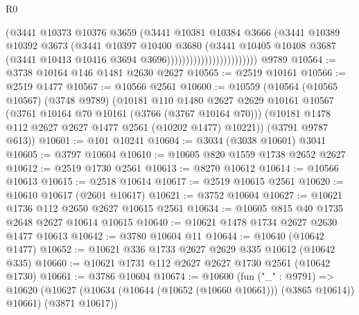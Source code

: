 \begin{lexlean}{R0}
\begin{coremodule}
                                        (@3441
                                          @10373
                                          @10376
                                          @3659
                                          (@3441
                                            @10381
                                            @10384
                                            @3666
                                            (@3441
                                              @10389
                                              @10392
                                              @3673
                                              (@3441
                                                @10397
                                                @10400
                                                @3680
                                                (@3441
                                                  @10405
                                                  @10408
                                                  @3687
                                                  (@3441
                                                    @10413
                                                    @10416
                                                    @3694
                                                    @3696))))))))))))))))))))))))
    @9789
@10564 := @3738 @10164 @146 @1481 @2630 @2627
@10565 := @2519 @10161
@10566 := @2519 @1477
@10567 := @10566 @2561
@10600 := @10559
    (@10564
      (@10565 @10567)
      (@3748 @9789)
      (@10181
        @110
        @1480
        @2627
        @2629
        @10161
        @10567
        (@3761 @10164 @70 @10161 (@3766 (@3767 @10164 @70)))
        (@10181 @1478 @112 @2627 @2627 @1477 @2561 (@10202 @1477) @10221))
      (@3791 @9787 @613))
@10601 := @101 @10241
@10604 := @3034 (@3038 @10601) @3041
@10605 := @3797 @10604
@10610 := @10605 @820 @1559 @1738 @2652 @2627
@10612 := @2519 @1730 @2561
@10613 := @8270 @10612
@10614 := @10566 @10613
@10615 := @2518 @10614
@10617 := @2519 @10615 @2561
@10620 := @10610 @10617 (@2601 @10617)
@10621 := @3752 @10604
@10627 := @10621 @1736 @112 @2650 @2627 @10615 @2561
@10634 := @10605 @815 @40 @1735 @2648 @2627 @10614 @10615
@10640 := @10621 @1478 @1734 @2627 @2630 @1477 @10613
@10642 := @3780 @10604 @11
@10644 := @10640 (@10642 @1477)
@10652 := @10621 @336 @1733 @2627 @2629 @335 @10612 (@10642 @335)
@10660 := @10621 @1731 @112 @2627 @2627 @1730 @2561 (@10642 @1730)
@10661 := @3786 @10604
@10674 := @10600
    (fun ("_" : @9791) =>
    @10620 (@10627 (@10634 (@10644 (@10652 (@10660 @10661))) (@3865 @10614)) @10661) (@3871 @10617))

\end{coremodule}
\end{lexlean}
